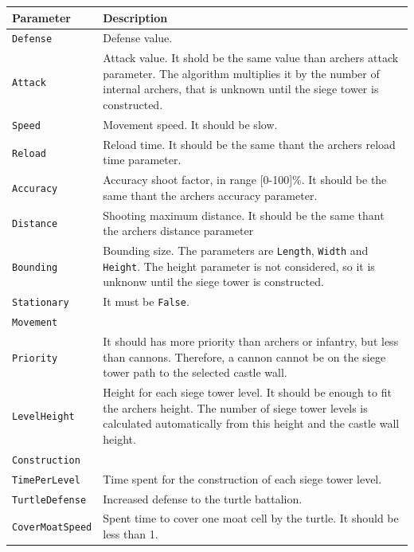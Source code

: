\documentclass[tog]{acmsiggraph}
\begin{document}
\begin{tabularx}{0.48\textwidth}{ |X|X| }
\hline 
\textbf{Parameter} & \textbf{Description} \\[0.15cm]
 \hline
 \texttt{Defense} & Defense value. \\
 \hline
 \texttt{Attack} & Attack value. It shold be the same value than archers attack parameter. The algorithm multiplies it by the number of internal archers, that is unknown until the siege tower is constructed. \\
 \hline
 \texttt{Speed} & Movement speed. It should be slow. \\
 \hline 
 \texttt{Reload} & Reload time. It should be the same thant the archers reload time parameter. \\
 \hline 
 \texttt{Accuracy} & Accuracy shoot factor, in range [0-100]\%.  It should be the same thant the archers accuracy parameter. \\
 \hline 
 \texttt{Distance} & Shooting maximum distance.  It should be the same thant the archers distance parameter\\
 \hline 
 \texttt{Bounding} & Bounding size. The parameters are \texttt{Length}, \texttt{Width} and \texttt{Height}. The height parameter is not considered, so it is unknonw until the siege tower is constructed.\\
 \hline 
 \texttt{Stationary} & It must be \texttt{False}. \\
 \hline 
 \texttt{Movement} & \\
 \texttt{Priority} & It should has more priority than archers or infantry, but less than cannons. Therefore, a cannon cannot be on the siege tower path to the selected castle wall. \\
 \hline
 \texttt{LevelHeight} & Height for each siege tower level. It should be enough to fit the archers height. The number of siege tower levels is calculated automatically from this height and the castle wall height. \\
 \hline
 \texttt{Construction} & \\
  \texttt{TimePerLevel} & Time spent for the construction of each siege tower level. \\
 \hline
 \texttt{TurtleDefense} & Increased defense to the turtle battalion. \\
 \hline
 \texttt{CoverMoatSpeed} & Spent time to cover one moat cell by the turtle. It should be less than 1. \\
 \hline 
\end{tabularx}
\end{document}
